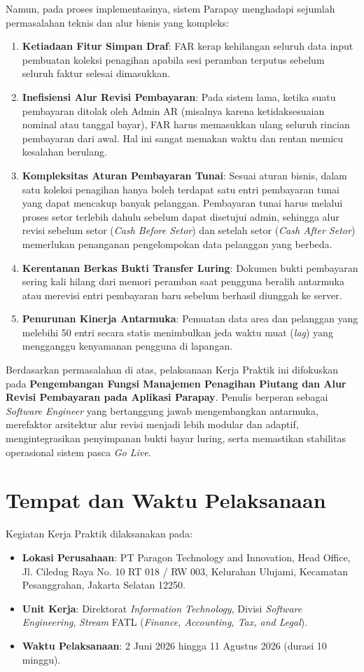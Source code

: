 Namun, pada proses implementasinya, sistem Parapay menghadapi sejumlah permasalahan teknis dan alur bisnis yang kompleks:
\begin{enumerate}[label=\arabic*)]
  \item \textbf{Ketiadaan Fitur Simpan Draf}: FAR kerap kehilangan seluruh data input pembuatan koleksi penagihan apabila sesi peramban terputus sebelum seluruh faktur selesai dimasukkan.
  \item \textbf{Inefisiensi Alur Revisi Pembayaran}: Pada sistem lama, ketika suatu pembayaran ditolak oleh Admin AR (misalnya karena ketidaksesuaian nominal atau tanggal bayar), FAR harus memasukkan ulang seluruh rincian pembayaran dari awal. Hal ini sangat memakan waktu dan rentan memicu kesalahan berulang.
  \item \textbf{Kompleksitas Aturan Pembayaran Tunai}: Sesuai aturan bisnis, dalam satu koleksi penagihan hanya boleh terdapat satu entri pembayaran tunai yang dapat mencakup banyak pelanggan. Pembayaran tunai harus melalui proses setor terlebih dahulu sebelum dapat disetujui admin, sehingga alur revisi sebelum setor (\textit{Cash Before Setor}) dan setelah setor (\textit{Cash After Setor}) memerlukan penanganan pengelompokan data pelanggan yang berbeda.
  \item \textbf{Kerentanan Berkas Bukti Transfer Luring}: Dokumen bukti pembayaran sering kali hilang dari memori peramban saat pengguna beralih antarmuka atau merevisi entri pembayaran baru sebelum berhasil diunggah ke server.
  \item \textbf{Penurunan Kinerja Antarmuka}: Pemuatan data area dan pelanggan yang melebihi 50 entri secara statis menimbulkan jeda waktu muat (\textit{lag}) yang mengganggu kenyamanan pengguna di lapangan.
\end{enumerate}

Berdasarkan permasalahan di atas, pelaksanaan Kerja Praktik ini difokuskan pada \textbf{Pengembangan Fungsi Manajemen Penagihan Piutang dan Alur Revisi Pembayaran pada Aplikasi Parapay}. Penulis berperan sebagai \textit{Software Engineer} yang bertanggung jawab mengembangkan antarmuka, merefaktor arsitektur alur revisi menjadi lebih modular dan adaptif, mengintegrasikan penyimpanan bukti bayar luring, serta memastikan stabilitas operasional sistem pasca \textit{Go Live}.

\section{Tempat dan Waktu Pelaksanaan}
Kegiatan Kerja Praktik dilaksanakan pada:
\begin{itemize}
  \item \textbf{Lokasi Perusahaan}: PT Paragon Technology and Innovation, Head Office, Jl. Ciledug Raya No. 10 RT 018 / RW 003, Kelurahan Ulujami, Kecamatan Pesanggrahan, Jakarta Selatan 12250.
  \item \textbf{Unit Kerja}: Direktorat \textit{Information Technology}, Divisi \textit{Software Engineering}, \textit{Stream} FATL (\textit{Finance, Accounting, Tax, and Legal}).
  \item \textbf{Waktu Pelaksanaan}: 2 Juni 2026 hingga 11 Agustus 2026 (durasi 10 minggu).
\end{itemize}

